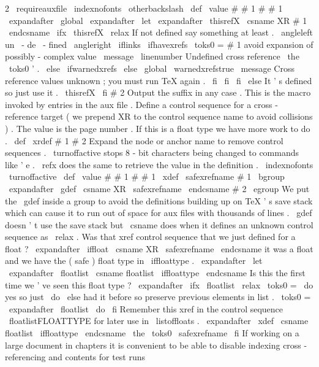 {{{{2
{
%
\
requireauxfile
{
%
\
indexnofonts
\
otherbackslash
\
def
\
value
#
#
1
{
#
#
1
}
%
\
expandafter
\
global
\
expandafter
\
let
\
expandafter
\
thisrefX
\
csname
XR
#
1
\
endcsname
}
%
\
ifx
\
thisrefX
\
relax
%
If
not
defined
say
something
at
least
.
\
angleleft
un
\
-
de
\
-
fined
\
angleright
\
iflinks
\
ifhavexrefs
{
\
toks0
=
{
#
1
}
%
avoid
expansion
of
possibly
-
complex
value
\
message
{
\
linenumber
Undefined
cross
reference
\
the
\
toks0
'
.
}
}
%
\
else
\
ifwarnedxrefs
\
else
\
global
\
warnedxrefstrue
\
message
{
Cross
reference
values
unknown
;
you
must
run
TeX
again
.
}
%
\
fi
\
fi
\
fi
\
else
%
It
'
s
defined
so
just
use
it
.
\
thisrefX
\
fi
#
2
%
Output
the
suffix
in
any
case
.
}
%
This
is
the
macro
invoked
by
entries
in
the
aux
file
.
Define
a
control
%
sequence
for
a
cross
-
reference
target
(
we
prepend
XR
to
the
control
sequence
%
name
to
avoid
collisions
)
.
The
value
is
the
page
number
.
If
this
is
a
float
%
type
we
have
more
work
to
do
.
%
\
def
\
xrdef
#
1
#
2
{
%
{
%
Expand
the
node
or
anchor
name
to
remove
control
sequences
.
%
\
turnoffactive
stops
8
-
bit
characters
being
changed
to
commands
%
like
'
e
.
\
refx
does
the
same
to
retrieve
the
value
in
the
definition
.
\
indexnofonts
\
turnoffactive
\
def
\
value
#
#
1
{
#
#
1
}
%
\
xdef
\
safexrefname
{
#
1
}
%
}
%
%
\
bgroup
\
expandafter
\
gdef
\
csname
XR
\
safexrefname
\
endcsname
{
#
2
}
%
\
egroup
%
We
put
the
\
gdef
inside
a
group
to
avoid
the
definitions
building
up
on
%
TeX
'
s
save
stack
which
can
cause
it
to
run
out
of
space
for
aux
files
with
%
thousands
of
lines
.
\
gdef
doesn
'
t
use
the
save
stack
but
\
csname
does
%
when
it
defines
an
unknown
control
sequence
as
\
relax
.
%
%
Was
that
xref
control
sequence
that
we
just
defined
for
a
float
?
\
expandafter
\
iffloat
\
csname
XR
\
safexrefname
\
endcsname
%
it
was
a
float
and
we
have
the
(
safe
)
float
type
in
\
iffloattype
.
\
expandafter
\
let
\
expandafter
\
floatlist
\
csname
floatlist
\
iffloattype
\
endcsname
%
%
Is
this
the
first
time
we
'
ve
seen
this
float
type
?
\
expandafter
\
ifx
\
floatlist
\
relax
\
toks0
=
{
\
do
}
%
yes
so
just
\
do
\
else
%
had
it
before
so
preserve
previous
elements
in
list
.
\
toks0
=
\
expandafter
{
\
floatlist
\
do
}
%
\
fi
%
%
Remember
this
xref
in
the
control
sequence
\
floatlistFLOATTYPE
%
for
later
use
in
\
listoffloats
.
\
expandafter
\
xdef
\
csname
floatlist
\
iffloattype
\
endcsname
{
\
the
\
toks0
{
\
safexrefname
}
}
%
\
fi
}
%
If
working
on
a
large
document
in
chapters
it
is
convenient
to
%
be
able
to
disable
indexing
cross
-
referencing
and
contents
for
test
runs
}}}}
